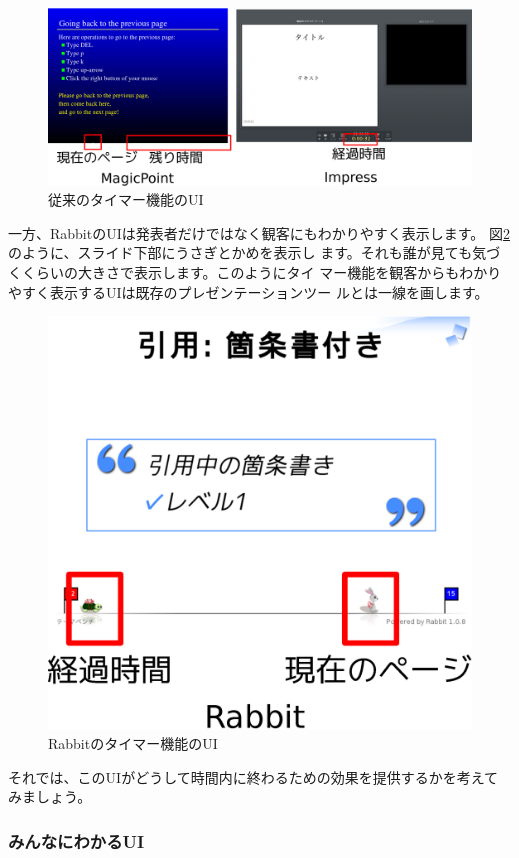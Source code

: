 \documentclass[mingoth,a4paper]{jsarticle}
\begin{document}
\begin{figure}[ht]
  \begin{center}
    \includegraphics[width=1\hsize]{image2012-gum/normal-timer-ui.eps}
  \end{center}
  \caption{従来のタイマー機能のUI}
  \label{fig:normal-timer-ui}
\end{figure}

一方、RabbitのUIは発表者だけではなく観客にもわかりやすく表示します。
図\ref{fig:rabbit-timer-ui}のように、スライド下部にうさぎとかめを表示し
ます。それも誰が見ても気づくくらいの大きさで表示します。このようにタイ
マー機能を観客からもわかりやすく表示するUIは既存のプレゼンテーションツー
ルとは一線を画します。

\begin{figure}[ht]
  \begin{center}
    \includegraphics[width=0.5\hsize]{image2012-gum/rabbit-timer-ui.eps}
  \end{center}
  \caption{Rabbitのタイマー機能のUI}
  \label{fig:rabbit-timer-ui}
\end{figure}

それでは、このUIがどうして時間内に終わるための効果を提供するかを考えて
みましょう。

\subsubsection{みんなにわかるUI}
\end{document}
